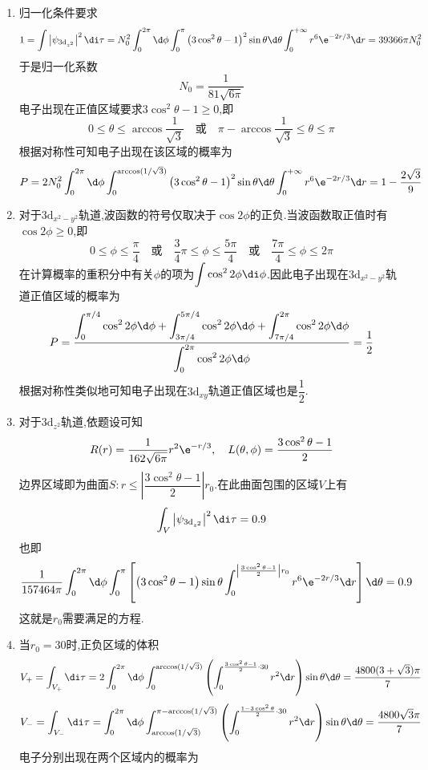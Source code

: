 \documentclass{ctexart}
\begin{document}
\begin{solution}
\begin{enumerate}[label=\tbf{(\alph*)}]
    \item 归一化条件要求
    \[1=\int\left|\psi_{3\text{d}_{z^2}}\right|^2\di\tau=N_0^2\int_0^{2\pi}\d\phi\int_0^{\pi}\left(3\cos^2\theta-1\right)^2\sin\theta\d\theta\int_0^{+\infty}r^6\e^{-2r/3}\d r=39366\pi N_0^2\]
    于是归一化系数
    \[N_0=\dfrac{1}{81\sqrt{6\pi}}\]
    电子出现在正值区域要求$3\cos^2\theta-1\geq0$,即
    \[0\leq\theta\leq\arccos\dfrac{1}{\sqrt{3}}\quad\text{或}\quad\pi-\arccos\dfrac{1}{\sqrt{3}}\leq\theta\leq\pi\]
    根据对称性可知电子出现在该区域的概率为
    \[P=2N_0^2\int_0^{2\pi}\d\phi\int_0^{\arccos(1/\sqrt3)}\left(3\cos^2\theta-1\right)^2\sin\theta\d\theta\int_0^{+\infty}r^6\e^{-2r/3}\d r=1-\dfrac{2\sqrt3}{9}\]
    \item 对于$3\text{d}_{x^2-y^2}$轨道,波函数的符号仅取决于$\cos2\phi$的正负.当波函数取正值时有$\cos2\phi\geq0$,即
    \[0\leq\phi\leq\dfrac{\pi}{4}\quad\text{或}\quad\dfrac{3}{4}\pi\leq\phi\leq\dfrac{5\pi}{4}\quad\text{或}\quad\dfrac{7\pi}{4}\leq\phi\leq2\pi\]
    在计算概率的重积分中有关$\phi$的项为$\displaystyle\int\cos^22\phi\di\phi$.因此电子出现在$3\text{d}_{x^2-y^2}$轨道正值区域的概率为
    \[P=\dfrac{\displaystyle\int_0^{\pi/4}\cos^22\phi\d\phi+\int_{3\pi/4}^{5\pi/4}\cos^22\phi\d\phi+\int_{7\pi/4}^{2\pi}\cos^22\phi\d\phi}{\displaystyle\int_0^{2\pi}\cos^22\phi\d\phi}=\dfrac{1}{2}\]
    根据对称性类似地可知电子出现在$3\text{d}_{xy}$轨道正值区域也是$\dfrac12$.
    \item 对于$3\text{d}_{z^2}$轨道,依题设可知
    \[R(r)=\dfrac{1}{162\sqrt{6\pi}}r^2\e^{-r/3},\quad L(\theta,\phi)=\dfrac{3\cos^2\theta-1}{2}\]
    边界区域即为曲面$S:r\leq\left|\dfrac{3\cos^2\theta-1}{2}\right|r_0$.在此曲面包围的区域$V$上有
    \[\int_V\left|\psi_{3\text{d}_{z^2}}\right|^2\di\tau=0.9\]
    也即
    \[\dfrac{1}{157464\pi}\int_0^{2\pi}\d\phi\int_0^{\pi}\left[\left(3\cos^2\theta-1\right)\sin\theta\int_0^{\left|\frac{3\cos^2\theta-1}{2}\right|r_0}r^6\e^{-2r/3}\d r\right]\d\theta=0.9\]
    这就是$r_0$需要满足的方程.
    \item 当$r_0=30$时,正负区域的体积
    \[V_+=\int_{V_+}\di\tau=2\int_0^{2\pi}\d\phi\int_0^{\arccos(1/\sqrt{3})}\left(\int_0^{\frac{3\cos^2\theta-1}{2}\cdot30}r^2\d r\right)\sin\theta\d\theta=\dfrac{4800(3+\sqrt3)\pi}{7}\]
    \[V_-=\int_{V_-}\di\tau=\int_0^{2\pi}\d\phi\int_{\arccos(1/\sqrt{3})}^{\pi-\arccos(1/\sqrt{3})}\left(\int_0^{\frac{1-3\cos^2\theta}{2}\cdot30}r^2\d r\right)\sin\theta\d\theta=\dfrac{4800\sqrt{3}\pi}{7}\]
    电子分别出现在两个区域内的概率为

\end{enumerate}
\end{solution}
\end{document}
